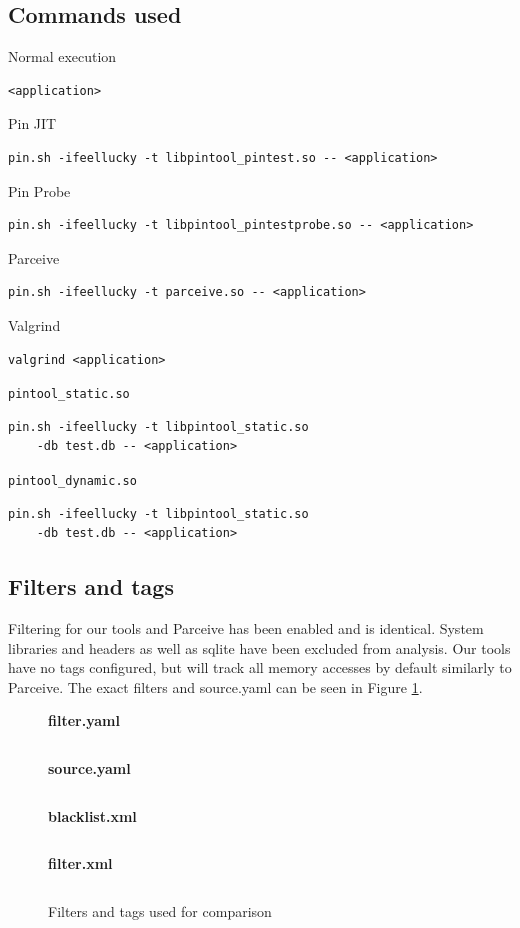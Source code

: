 \subsection{Commands used}

Normal execution
\begin{lstlisting}[style=BashInputStyle]
<application>
\end{lstlisting}

Pin JIT
\begin{lstlisting}[style=BashInputStyle]
pin.sh -ifeellucky -t libpintool_pintest.so -- <application>
\end{lstlisting}

Pin Probe
\begin{lstlisting}[style=BashInputStyle]
pin.sh -ifeellucky -t libpintool_pintestprobe.so -- <application>
\end{lstlisting}

Parceive
\begin{lstlisting}[style=BashInputStyle]
pin.sh -ifeellucky -t parceive.so -- <application>
\end{lstlisting}

Valgrind
\begin{lstlisting}[style=BashInputStyle]
valgrind <application>
\end{lstlisting}

\texttt{pintool\_static.so}
\begin{lstlisting}[style=BashInputStyle]
pin.sh -ifeellucky -t libpintool_static.so
	-db test.db -- <application>
\end{lstlisting}

\texttt{pintool\_dynamic.so}
\begin{lstlisting}[style=BashInputStyle]
pin.sh -ifeellucky -t libpintool_static.so
	-db test.db -- <application>
\end{lstlisting}

\subsection{Filters and tags}

Filtering for our tools and Parceive has been enabled and is identical. System libraries and headers as well as sqlite have been excluded from analysis. Our tools have no tags configured, but will track all memory accesses by default similarly to Parceive. The exact filters and source.yaml can be seen in Figure \ref{cap4:compconfig}.

\begin{figure}
	\begin{center}
		\textbf{filter.yaml}
		\inputminted[linenos, fontsize=\scriptsize]{yaml}{../tests/filter.yaml}
				
		\textbf{source.yaml}
		\inputminted[linenos, fontsize=\scriptsize]{yaml}{../tests/emptysource.yaml}
		
		\textbf{blacklist.xml}
		\inputminted[linenos, fontsize=\scriptsize]{xml}{blacklist.xml}
		
		\textbf{filter.xml}
		\inputminted[linenos, fontsize=\scriptsize]{xml}{filter.xml}
	\end{center}
	\caption{Filters and tags used for comparison}
	\label{cap4:compconfig}
\end{figure}

